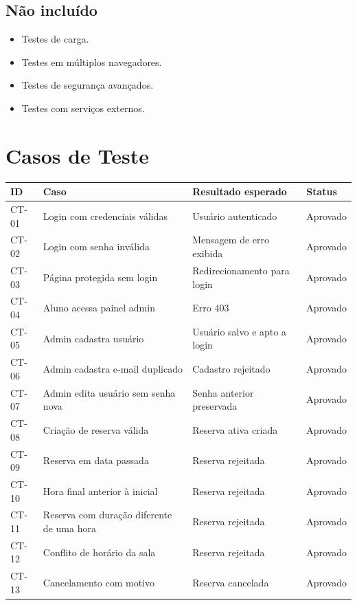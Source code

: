 \documentclass[12pt,a4paper]{article}
\begin{document}
\subsection{Não incluído}
\begin{itemize}
    \item Testes de carga.
    \item Testes em múltiplos navegadores.
    \item Testes de segurança avançados.
    \item Testes com serviços externos.
\end{itemize}

\section{Casos de Teste}
\begin{longtable}{|p{1.6cm}|p{6.2cm}|p{5.4cm}|p{1.8cm}|}
\hline
\textbf{ID} & \textbf{Caso} & \textbf{Resultado esperado} & \textbf{Status} \\ \hline
CT-01 & Login com credenciais válidas & Usuário autenticado & Aprovado \\ \hline
CT-02 & Login com senha inválida & Mensagem de erro exibida & Aprovado \\ \hline
CT-03 & Página protegida sem login & Redirecionamento para login & Aprovado \\ \hline
CT-04 & Aluno acessa painel admin & Erro 403 & Aprovado \\ \hline
CT-05 & Admin cadastra usuário & Usuário salvo e apto a login & Aprovado \\ \hline
CT-06 & Admin cadastra e-mail duplicado & Cadastro rejeitado & Aprovado \\ \hline
CT-07 & Admin edita usuário sem senha nova & Senha anterior preservada & Aprovado \\ \hline
CT-08 & Criação de reserva válida & Reserva ativa criada & Aprovado \\ \hline
CT-09 & Reserva em data passada & Reserva rejeitada & Aprovado \\ \hline
CT-10 & Hora final anterior à inicial & Reserva rejeitada & Aprovado \\ \hline
CT-11 & Reserva com duração diferente de uma hora & Reserva rejeitada & Aprovado \\ \hline
CT-12 & Conflito de horário da sala & Reserva rejeitada & Aprovado \\ \hline
CT-13 & Cancelamento com motivo & Reserva cancelada & Aprovado \\ \hline

\end{longtable}
\end{document}
